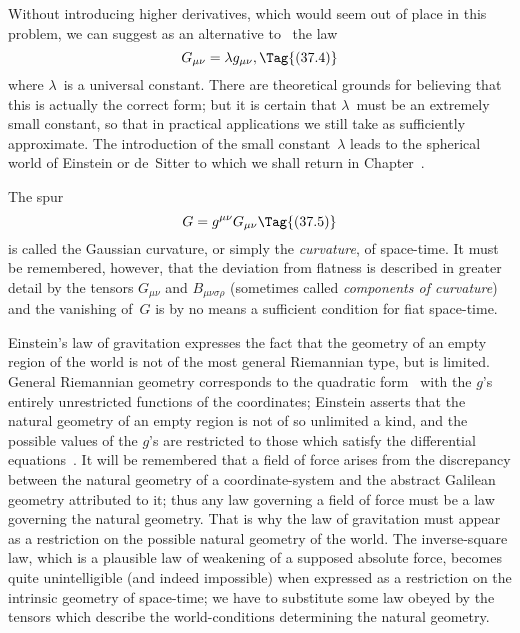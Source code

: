 \documentclass[12pt]{book}
\begin{document}
Without introducing higher derivatives, which would seem out of place in
this problem, we can suggest as an alternative to~ the law
\[
G_{\mu\nu} = \lambda g_{\mu\nu},
\Tag{(37.4)}
\]
where $\lambda$~is a universal constant. There are theoretical grounds for believing
that this is actually the correct form; but it is certain that $\lambda$~must be an
extremely small constant, so that in practical applications we still take 
as sufficiently approximate. The introduction of the small constant~$\lambda$ leads to
the spherical world of Einstein or de~Sitter to which we shall return in
Chapter~\@.

The spur
\[
G = g^{\mu\nu} G_{\mu\nu}
\Tag{(37.5)}
\]
is called the Gaussian curvature, or simply the \emph{curvature}, of space-time. It
%
%
must be remembered, however, that the deviation from flatness is described
in greater detail by the tensors $G_{\mu\nu}$ and $B_{\mu\nu\sigma\rho}$ (sometimes called \emph{components of
curvature}) and the vanishing of~$G$ is by no means a sufficient condition for fiat
space-time.

Einstein's law of gravitation expresses the fact that the geometry of an
empty region of the world is not of the most general Riemannian type, but is
limited. General Riemannian geometry corresponds to the quadratic form~
with the $g$'s entirely unrestricted functions of the coordinates; Einstein
asserts that the natural geometry of an empty region is not of so unlimited a
kind, and the possible values of the $g$'s are restricted to those which satisfy
the differential equations~. It will be remembered that a field of force
arises from the discrepancy between the natural geometry of a coordinate-system
and the abstract Galilean geometry attributed to it; thus any law
governing a field of force must be a law governing the natural geometry.
That is why the law of gravitation must appear as a restriction on the possible
natural geometry of the world. The inverse-square law, which is a
plausible law of weakening of a supposed absolute force, becomes quite unintelligible
(and indeed impossible) when expressed as a restriction on the
intrinsic geometry of space-time; we have to substitute some law obeyed
by the tensors which describe the world-conditions determining the natural
geometry.

%
%
\end{document}
